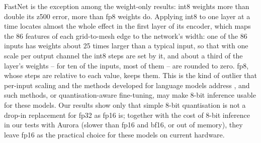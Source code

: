 FastNet is the exception among the weight-only results: int8
weights more than double its z500 error, more than fp8 weights do.
Applying int8 to one layer at a time locates almost the whole effect in
the first layer of its encoder, which maps the 86 features of each
grid-to-mesh edge to the network's width: one of the 86 inputs has
weights about 25 times larger than a typical input, so that with one
scale per output channel the int8 steps are set by it, and about a third
of the layer's weights -- for ten of the inputs, most of them -- are
rounded to zero. fp8, whose steps are relative to each value, keeps them.
This is the kind of outlier that per-input scaling and the methods
developed for language models address
\citep{dettmers2022llmint8, xiao2022smoothquant}, and such methods, or
quantisation-aware fine-tuning, may make 8-bit inference usable for these
models. Our results show only that simple 8-bit quantisation is not a
drop-in replacement for fp32 as fp16 is; together with the cost of 8-bit
inference in our tests with Aurora (slower than fp16 and bf16, or out of
memory), they leave fp16 as the
practical choice for these models on current hardware.
